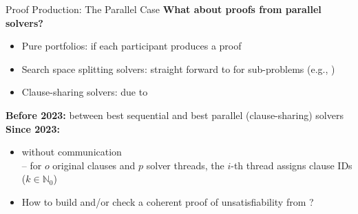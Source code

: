 \documentclass[t,english]{sdqbeamer}
\begin{document}
\begin{frame}{Proof Production: The Parallel Case}
	\textbf{What about proofs from parallel solvers?}
	\begin{itemize}
		\item Pure portfolios: \pause {} if each participant produces a proof
		\item Search space splitting solvers: \pause straight forward to  for sub-problems (e.g., \cite{heule2016solving})
		\item Clause-sharing solvers: \pause {} due to  \cite{heule2014validating}
	\end{itemize}
	
	\vspace*{2mm}
	\textbf{Before 2023:}  between best sequential and best parallel (clause-sharing) solvers\\[2mm]
	\pause
	\textbf{Since 2023:}  \cite{michaelson2023unsatisfiability}
	\begin{itemize}
		\item {} without communication\\
		-- for $o$ original clauses and $p$ solver threads, the $i$-th thread assigns clause IDs  ($k \in \mathbb{N}_0$)
		\item How to build and/or check a coherent proof of unsatisfiability from ?
	\end{itemize}
\end{frame}
\end{document}
